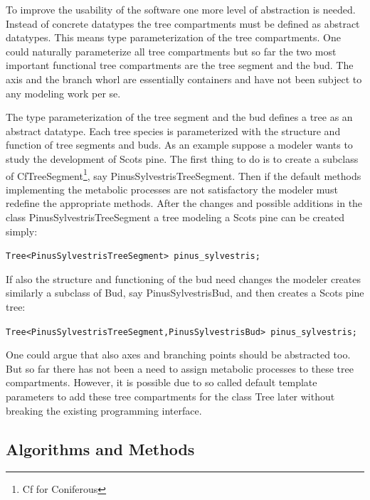 To improve the usability of the software one more level of abstraction
is needed. Instead of concrete datatypes the tree compartments must be
defined as abstract datatypes. This means type parameterization of the
tree  compartments.   One  could   naturally  parameterize  all   tree
compartments  but so  far   the two  most important   functional  tree
compartments  are the tree  segment  and the  bud.   The axis  and the
branch whorl are  essentially containers and have  not been subject to
any modeling work per se.

The type  parameterization of the tree  segment and the  bud defines a
tree as an abstract datatype.  Each tree species is parameterized with
the structure and  function of tree segments and  buds.  As an example
suppose a modeler  wants to study the development  of Scots pine.  The
first thing to do is to create a subclass of CfTreeSegment\footnote{Cf
for Coniferous}, say  PinusSylvestrisTreeSegment.  Then if the default
methods implementing the metabolic  processes are not satisfactory the
modeler must redefine the  appropriate methods.  After the changes and
possible  additions  in the  class  PinusSylvestrisTreeSegment a  tree
modeling a Scots pine can be created simply:

\begin{center}
\tt Tree<PinusSylvestrisTreeSegment> pinus\_sylvestris;\rm
\end{center}

If also  the structure  and functioning of   the bud need  changes the
modeler creates similarly a subclass  of Bud, say  PinusSylvestrisBud,
and then creates a Scots pine tree:

\begin{center}
\tt Tree<PinusSylvestrisTreeSegment,PinusSylvestrisBud> pinus\_sylvestris;\rm
\end{center}

One could  argue  that  also axes   and  branching points  should be
abstracted too.  But so   far there has   not  been a need   to assign
metabolic   processes to  these  tree  compartments.   However, it  is
possible due to  so called  default  template parameters to add  these
tree    compartments for the class  Tree   later  without breaking the
existing programming interface.

\subsection{Algorithms and Methods}

